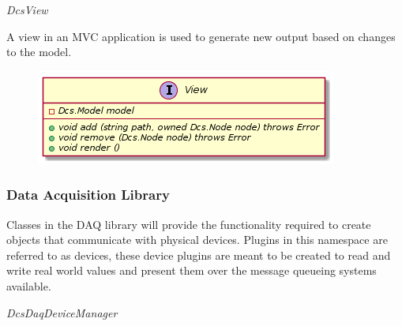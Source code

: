      \emph{DcsView}

      \vspace*{-0.75cm}
      \begin{minipage}[t]{0.5\textwidth}
      	\vspace*{0.5cm}
        A view in an MVC application is used to generate new output based on
        changes to the model.
      \end{minipage} \hfill
      \begin{minipage}[t]{0.45\textwidth}
        \begin{figure}[H]
          \includegraphics[width=\textwidth]{figures/design/class/core/view}
          \label{fig:dsg-classes-view}
        \end{figure}
      \end{minipage}

    \subsubsection{Data Acquisition Library}\label{sec:dsg-classes-daq}

      Classes in the DAQ library will provide the functionality required to
      create objects that communicate with physical devices. Plugins in this
      namespace are referred to as devices, these device plugins are meant to be
      created to read and write real world values and present them over the
      message queueing systems available.

      \emph{DcsDaqDeviceManager}

